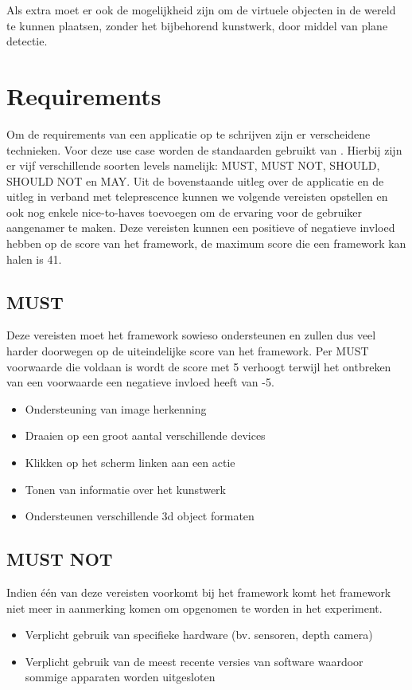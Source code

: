 Als extra moet er ook de mogelijkheid zijn om de virtuele objecten in de wereld te kunnen plaatsen, zonder het bijbehorend kunstwerk, door middel van plane detectie.

\section{Requirements}
Om de requirements van een applicatie op te schrijven zijn er verscheidene technieken. Voor deze use case worden de standaarden gebruikt van \textcite{Bradner1997}. Hierbij zijn er vijf verschillende soorten levels namelijk: MUST, MUST NOT, SHOULD, SHOULD NOT en MAY. Uit de bovenstaande uitleg over de applicatie en de uitleg in verband met teleprescence kunnen we volgende vereisten opstellen en ook nog enkele nice-to-haves toevoegen om de ervaring voor de gebruiker aangenamer te maken. Deze vereisten kunnen een positieve of negatieve invloed hebben op de score van het framework, de maximum score die een framework kan halen is 41.

\subsection{MUST}
Deze vereisten moet het framework sowieso ondersteunen en zullen dus veel harder doorwegen op de uiteindelijke score van het framework. Per MUST voorwaarde die voldaan is wordt de score met 5 verhoogt terwijl het ontbreken van een voorwaarde een negatieve invloed heeft van -5.
\begin{itemize}
    \item Ondersteuning van image herkenning
    \item Draaien op een groot aantal verschillende devices
    \item Klikken op het scherm linken aan een actie
    \item Tonen van informatie over het kunstwerk
    \item Ondersteunen verschillende 3d object formaten
\end{itemize} 

\subsection{MUST NOT}
Indien één van deze vereisten voorkomt bij het framework komt het framework niet meer in aanmerking komen om opgenomen te worden in het experiment.
\begin{itemize}
    \item Verplicht gebruik van specifieke hardware (bv. sensoren, depth camera)
    \item Verplicht gebruik van de meest recente versies van software waardoor sommige apparaten worden uitgesloten
\end{itemize} 

